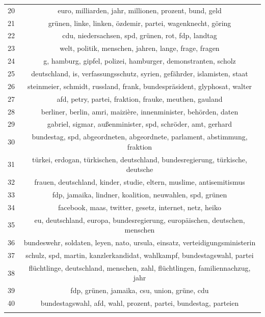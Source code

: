 \documentclass[
]{article}
\begin{document}
\begin{table}[!htbp]
\begin{tabular}{@{\extracolsep{5pt}} cc}
20 & euro, milliarden, jahr, millionen, prozent, bund, geld \\ 
21 & grünen, linke, linken, özdemir, partei, wagenknecht, göring \\ 
22 & cdu, niedersachsen, spd, grünen, rot, fdp, landtag \\ 
23 & welt, politik, menschen, jahren, lange, frage, fragen \\ 
24 & g, hamburg, gipfel, polizei, hamburger, demonstranten, scholz \\ 
25 & deutschland, is, verfassungsschutz, syrien, gefährder, islamisten, staat \\ 
26 & steinmeier, schmidt, russland, frank, bundespräsident, glyphosat, walter \\ 
27 & afd, petry, partei, fraktion, frauke, meuthen, gauland \\ 
28 & berliner, berlin, amri, maizière, innenminister, behörden, daten \\ 
29 & gabriel, sigmar, außenminister, spd, schröder, amt, gerhard \\ 
30 & bundestag, spd, abgeordneten, abgeordnete, parlament, abstimmung, fraktion \\ 
31 & türkei, erdogan, türkischen, deutschland, bundesregierung, türkische, deutsche \\ 
32 & frauen, deutschland, kinder, studie, eltern, muslime, antisemitismus \\ 
33 & fdp, jamaika, lindner, koalition, neuwahlen, spd, grünen \\ 
34 & facebook, maas, twitter, gesetz, internet, netz, heiko \\ 
35 & eu, deutschland, europa, bundesregierung, europäischen, deutschen, menschen \\ 
36 & bundeswehr, soldaten, leyen, nato, ursula, einsatz, verteidigungsministerin \\ 
37 & schulz, spd, martin, kanzlerkandidat, wahlkampf, bundestagswahl, partei \\ 
38 & flüchtlinge, deutschland, menschen, zahl, flüchtlingen, familiennachzug, jahr \\ 
39 & fdp, grünen, jamaika, csu, union, grüne, cdu \\ 
40 & bundestagswahl, afd, wahl, prozent, partei, bundestag, parteien \\ 
\hline \\[-1.8ex] 
\end{tabular} 
\end{table}
\end{document}
